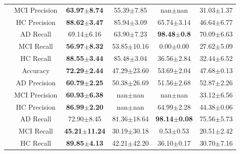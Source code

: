 \begin{table}[h]
\begin{tabular}{|c|c|c|c|c|c|}
    & MCI Precision & \multicolumn{1}{c}{{\bfseries 63.97$\pm$8.74}} & \multicolumn{1}{c}{55.39$\pm$7.85} & \multicolumn{1}{c}{nan$\pm$nan} & 31.03$\pm$1.37\\
    & HC Precision & \multicolumn{1}{c}{{\bfseries 88.62$\pm$3.47}} & \multicolumn{1}{c}{85.94$\pm$3.09} & \multicolumn{1}{c}{65.74$\pm$3.14} & 46.64$\pm$6.77\\
    & AD Recall & \multicolumn{1}{c}{69.14$\pm$6.16} & \multicolumn{1}{c}{63.90$\pm$7.23} & \multicolumn{1}{c}{{\bfseries 98.48$\pm$0.8}} & 70.09$\pm$6.63\\
    & MCI Recall & \multicolumn{1}{c}{{\bfseries 56.97$\pm$8.32}} & \multicolumn{1}{c}{53.85$\pm$10.16} & \multicolumn{1}{c}{0.00$\pm$0.00} & 27.62$\pm$5.09\\
    & HC Recall & \multicolumn{1}{c}{{\bfseries 88.55$\pm$3.44}} & \multicolumn{1}{c}{85.48$\pm$3.04} & \multicolumn{1}{c}{36.56$\pm$2.84} & 32.44$\pm$6.52\\
    \Xhline{1pt}
    \multirow{7}{*}{2} %
    & Accuracy & \multicolumn{1}{c}{{\bfseries 72.29$\pm$2.44}} & \multicolumn{1}{c}{47.29$\pm$23.60} & \multicolumn{1}{c}{53.69$\pm$2.04} & 47.68$\pm$0.13\\
    & AD Precision & \multicolumn{1}{c}{{\bfseries 60.79$\pm$2.25}} & \multicolumn{1}{c}{50.38$\pm$26.69} & \multicolumn{1}{c}{51.56$\pm$2.68} & 52.87$\pm$2.26\\
    & MCI Precision & \multicolumn{1}{c}{{\bfseries 60.93$\pm$6.38}} & \multicolumn{1}{c}{nan$\pm$nan} & \multicolumn{1}{c}{nan$\pm$nan} & 33.12$\pm$6.56\\
    & HC Precision & \multicolumn{1}{c}{{\bfseries 86.99$\pm$2.20}} & \multicolumn{1}{c}{nan$\pm$nan} & \multicolumn{1}{c}{64.99$\pm$2.28} & 44.38$\pm$0.06\\
    & AD Recall & \multicolumn{1}{c}{72.90$\pm$8.45} & \multicolumn{1}{c}{81.36$\pm$18.64} & \multicolumn{1}{c}{{\bfseries 98.14$\pm$0.08}} & 75.56$\pm$5.73\\
    & MCI Recall & \multicolumn{1}{c}{{\bfseries 45.21$\pm$11.24}} & \multicolumn{1}{c}{30.19$\pm$30.18} & \multicolumn{1}{c}{0.53$\pm$0.53} & 20.51$\pm$2.42\\
    & HC Recall & \multicolumn{1}{c}{{\bfseries 89.85$\pm$4.13}} & \multicolumn{1}{c}{42.21$\pm$42.20} & \multicolumn{1}{c}{36.10$\pm$0.17} & 30.70$\pm$7.16\\

\end{tabular}
\end{table}
